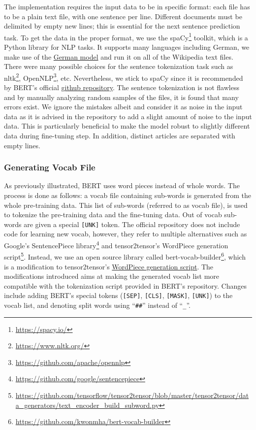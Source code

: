 The implementation requires the input data to be in specific format: each file has to be a plain text file, with one sentence per line. Different documents must be delimited by empty new lines; this is essential for the next sentence prediction task.
To get the data in the proper format, we use the spaCy\footnote{\url{https://spacy.io/}} toolkit, which is a Python library for \ac{NLP} tasks. It supports many languages including German, we make use of the \href{https://spacy.io/models/de}{German model} and run it on all of the Wikipedia text files. There were many possible choices for the sentence tokenization task such as nltk\footnote{\url{https://www.nltk.org/}}, OpenNLP\footnote{\url{https://github.com/apache/opennlp}}, etc. Nevertheless, we stick to spaCy since it is recommended by \ac{BERT}'s official \href{https://github.com/google-research/bert}{github repository}. The sentence tokenization is not flawless and by manually analyzing random samples of the files, it is found that many errors exist. We ignore the mistakes albeit and consider it as noise in the input data as it is advised in the repository to add a slight amount of noise to the input data. This is particularly beneficial to make the model robust to slightly different data during fine-tuning step. In addition, distinct articles are separated with empty lines.

\subsubsection{Generating Vocab File}
\label{meth:s5_sub3_subsub2}

As previously illustrated, \ac{BERT} uses word pieces instead of whole words. The process is done as follows: a vocab file containing sub-words is generated from the whole pre-training data. This list of sub-words (referred to as vocab file), is used to tokenize the pre-training data and the fine-tuning data. Out of vocab sub-words are given a special \texttt{[UNK]} token. The official repository does not include code for learning new vocab, however, they refer to multiple alternatives such as Google's SentencePiece library\footnote{\url{https://github.com/google/sentencepiece}} and tensor2tensor's WordPiece generation script\footnote{\url{https://github.com/tensorflow/tensor2tensor/blob/master/tensor2tensor/data_generators/text_encoder_build_subword.py}}. Instead, we use an open source library called bert-vocab-builder\footnote{\url{https://github.com/kwonmha/bert-vocab-builder}}, which is a modification to tensor2tensor's \href{https://github.com/tensorflow/tensor2tensor/blob/master/tensor2tensor/data_generators/text_encoder_build_subword.py}{WordPiece generation script}. The modifications introduced aims at making the generated vocab list more compatible with the tokenization script provided in \ac{BERT}'s repository. Changes include adding \ac{BERT}'s special tokens (\texttt{[SEP]}, \texttt{[CLS]}, \texttt{[MASK]}, \texttt{[UNK]}) to the vocab list, and denoting split words using \enquote{\texttt{\#\#}} instead of \enquote{\texttt{\_}}. 

